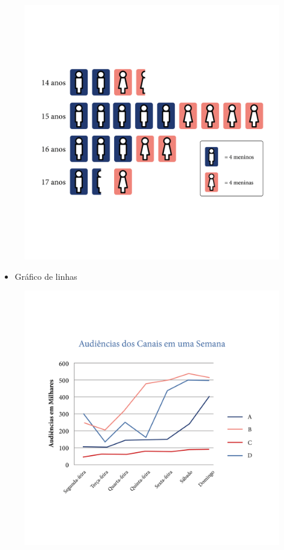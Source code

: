 {\begin{figure}[htpb!]
\includegraphics[width=\textwidth]{../ilustracoes/MAT5/SAEB_5ANO_MAT_figura58.png}
\end{figure}

\begin{itemize}
\item
  Gráfico de linhas
\end{itemize}

\begin{figure}[htpb!]
\includegraphics[width=\textwidth]{../ilustracoes/MAT5/SAEB_5ANO_MAT_figura59.png}
\end{figure}

}
